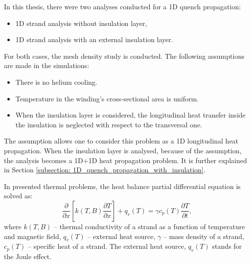 
In this thesis, there were two analyses conducted for a 1D quench propagation: 

\begin{itemize}
    \item 1D strand analysis without insulation layer,
    \item 1D strand analysis with an external insulation layer.
\end{itemize}

For both cases, the mesh density study is conducted. The following assumptions are made in the simulations: 

\begin{itemize}
    \item There is no helium cooling.
    \item Temperature in the winding's cross-sectional area is uniform.
    \item When the insulation layer is considered, the longitudinal heat transfer inside the insulation is neglected with respect to the transversal one.
\end{itemize}

The  assumption allows one to consider this problem as a 1D longitudinal heat propagation. When the insulation layer is analysed, because of the  assumption, the analysis becomes a 1D+1D heat propagation problem. It is further explained in Section \ref{subsection: 1D_quench_propagation_with_insulation}.

In presented thermal problems, the heat balance partial differential equation is solved as:
\begin{equation}
    \frac{\partial}{\partial x}[k(T, B) \frac{\partial T}{\partial x}] + q_v(T) = \gamma c_p(T) \frac{\partial T}{\partial t},
\end{equation}
where $k(T, B)$ -- thermal conductivity of a strand as a function of temperature and magnetic field, $q_v(T)$ -- external heat source, $\gamma$ -- mass density of a strand, $c_p(T)$ -- specific heat of a strand. The external heat source, $q_v(T)$ stands for the Joule effect.